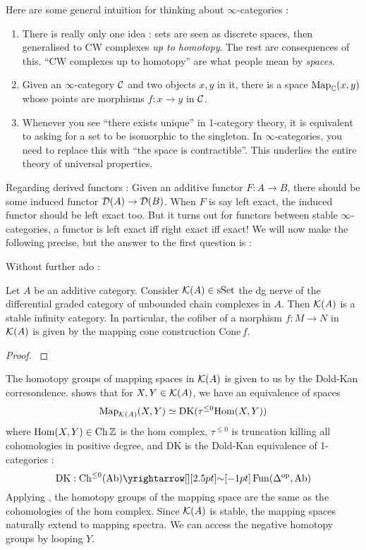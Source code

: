 \documentclass{article}
\begin{document}
Here are some general intuition for thinking about $\infty$-categories : 
\begin{enumerate}
  \item There is really only one idea : 
  sets are seen as discrete spaces,
  then generalised to CW complexes \emph{up to homotopy}.
  The rest are consequences of this.
  ``CW complexes up to homotopy'' are what people
  mean by \emph{spaces}.
  \item Given an $\infty$-category $\mathcal{C}$ and two objects $x , y$ in it,
  there is a space $\mathrm{Map}_{\mathbb{C}}(x , y)$ whose points are morphisms 
  $f : x \to y$ in $\mathcal{C}$.
  \item Whenever you see ``there exists unique'' in 1-category theory,
  it is equivalent to asking for a set to be isomorphic to the singleton.
  In $\infty$-categories, you need to replace
  this with ``the space is contractible''.
  This underlies the entire theory of universal properties.
\end{enumerate}
Regarding derived functors : 
Given an additive functor $F : A \to B$,
there should be some induced functor $\mathcal{D}(A) \to \mathcal{D}(B)$.
When $F$ is say left exact, 
the induced functor should be left exact too.
But it turns out for functors between stable $\infty$-categories,
a functor is left exact iff right exact iff exact!
\cite[Prop. 1.1.4.1]{lurie-HA}
We will now make the following precise, but the answer to the first question is :
\begin{center}
\end{center}
Without further ado :
\begin{prop}

  Let $A$ be an additive category.
  Consider $\mathcal{K}(A) \in \operatorname{sSet}$ 
  the dg nerve of the differential graded
  category of unbounded chain complexes in $A$.
  Then $\mathcal{K}(A)$ is a stable infinity category.
  In particular, the cofiber of a morphism $f : M \to N$ in $\mathcal{K}(A)$
  is given by the mapping cone construction $\mathrm{Cone}\,f$.
  \cite[Remark 1.3.2.17]{lurie-HA}
\end{prop}
\begin{proof}
  \cite[Prop. 1.3.2.10]{lurie-HA}
\end{proof}
The homotopy groups of mapping spaces in $\mathcal{K}(A)$ is given to us by
the Dold-Kan corresondence.
\cite[Remark 1.3.1.12]{lurie-HA}
shows that for $X , Y \in \mathcal{K}(A)$,
we have an equivalence of spaces \[
  \mathrm{Map}_{\mathcal{K}(A)}(X , Y) \simeq \mathrm{DK}(\tau^{\leq 0} {\mathrm{Hom}}(X, Y))
\]
where $\mathrm{Hom}(X , Y) \in \mathrm{Ch}\,\mathbb{Z}$ is the hom complex,
$\tau^{\leq 0}$ is truncation killing all cohomologies in positive degree, 
and $\mathrm{DK}$ is the Dold-Kan equivalence
of 1-categories : \[
  \mathrm{DK} : \CH^{\leq 0}(\AB) \map{\sim}{} \FUN(\De^{\OP} , \AB)
\]
Applying \cite[Remark 1.2.3.14]{lurie-HA}, the homotopy groups
of the mapping space are the same as the cohomologies of the hom complex.
Since $\mathcal{K}(A)$ is stable,
the mapping spaces naturally extend to mapping spectra.
We can access the negative homotopy groups by looping $Y$.
\end{document}
